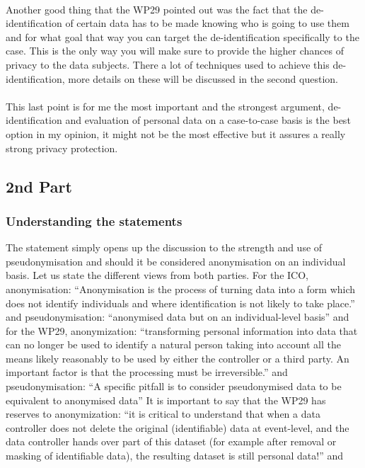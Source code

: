 \documentclass[9pt]{article}
\begin{document}
\\
Another good thing that the WP29 pointed out was the fact that the de-identification of certain data has to be made knowing who is going to use them and for what goal that way you can target the de-identification specifically to the case. This is the only way you will make sure to provide the higher chances of privacy to the data subjects. There a lot of techniques used to achieve this de-identification, more details on these will be discussed in the second question.\cite{differential privacy}\cite{WP29:2007}\cite{Sophie:2016}\\
\\
This last point is for me the most important and the strongest argument, de-identification and evaluation of personal data on a case-to-case basis is the best option in my opinion, it might not be the most effective but it assures a really strong privacy protection.

\subsection{2nd Part}
\subsubsection{Understanding the statements}
The statement simply opens up the discussion to the strength and use of pseudonymisation and should it be considered anonymisation on an individual basis. Let us state the different views from both parties. For the ICO, anonymisation: \enquote{Anonymisation is the process of turning data into a form which does not identify individuals and where identification is not likely to take place.} and pseudonymisation: \enquote{anonymised data but on an individual-level basis}\cite{Anonymisation(ICO)}
and for the WP29, anonymization: \enquote{transforming personal information into data that can no longer be used to identify a natural person taking into account all the means likely reasonably to be used by either the controller or a third party.  An important factor is that the processing must be irreversible.} and pseudonymisation: \enquote{A  specific  pitfall  is  to consider pseudonymised  data  to be  equivalent  to anonymised  data}
It is important to say that the WP29 has reserves to anonymization: \enquote{it is critical to understand  that  when a data controller does not delete the original  (identifiable) data at event-level, and the data controller hands over part of this dataset (for example after removal or masking of identifiable data), the  resulting dataset is still personal data!} and \cite{Pseudonymisation}\cite{WP29:2007}
\end{document}

